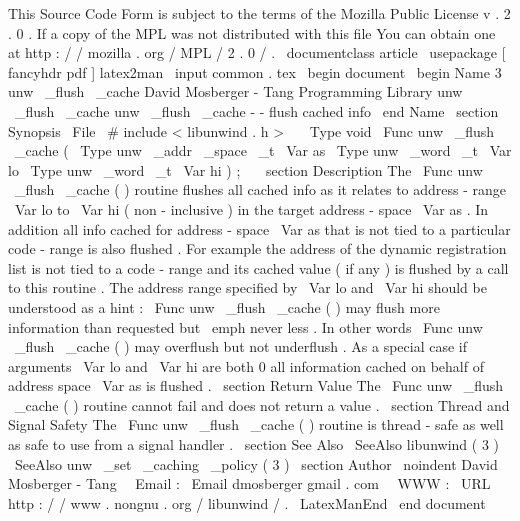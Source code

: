 %
This
Source
Code
Form
is
subject
to
the
terms
of
the
Mozilla
Public
%
License
v
.
2
.
0
.
If
a
copy
of
the
MPL
was
not
distributed
with
this
%
file
You
can
obtain
one
at
http
:
/
/
mozilla
.
org
/
MPL
/
2
.
0
/
.
\
documentclass
{
article
}
\
usepackage
[
fancyhdr
pdf
]
{
latex2man
}
\
input
{
common
.
tex
}
\
begin
{
document
}
\
begin
{
Name
}
{
3
}
{
unw
\
_flush
\
_cache
}
{
David
Mosberger
-
Tang
}
{
Programming
Library
}
{
unw
\
_flush
\
_cache
}
unw
\
_flush
\
_cache
-
-
flush
cached
info
\
end
{
Name
}
\
section
{
Synopsis
}
\
File
{
\
#
include
<
libunwind
.
h
>
}
\
\
\
Type
{
void
}
\
Func
{
unw
\
_flush
\
_cache
}
(
\
Type
{
unw
\
_addr
\
_space
\
_t
}
\
Var
{
as
}
\
Type
{
unw
\
_word
\
_t
}
\
Var
{
lo
}
\
Type
{
unw
\
_word
\
_t
}
\
Var
{
hi
}
)
;
\
\
\
section
{
Description
}
The
\
Func
{
unw
\
_flush
\
_cache
}
(
)
routine
flushes
all
cached
info
as
it
relates
to
address
-
range
\
Var
{
lo
}
to
\
Var
{
hi
}
(
non
-
inclusive
)
in
the
target
address
-
space
\
Var
{
as
}
.
In
addition
all
info
cached
for
address
-
space
\
Var
{
as
}
that
is
not
tied
to
a
particular
code
-
range
is
also
flushed
.
For
example
the
address
of
the
dynamic
registration
list
is
not
tied
to
a
code
-
range
and
its
cached
value
(
if
any
)
is
flushed
by
a
call
to
this
routine
.
The
address
range
specified
by
\
Var
{
lo
}
and
\
Var
{
hi
}
should
be
understood
as
a
hint
:
\
Func
{
unw
\
_flush
\
_cache
}
(
)
may
flush
more
information
than
requested
but
\
emph
{
never
}
less
.
In
other
words
\
Func
{
unw
\
_flush
\
_cache
}
(
)
may
overflush
but
not
underflush
.
As
a
special
case
if
arguments
\
Var
{
lo
}
and
\
Var
{
hi
}
are
both
0
all
information
cached
on
behalf
of
address
space
\
Var
{
as
}
is
flushed
.
\
section
{
Return
Value
}
The
\
Func
{
unw
\
_flush
\
_cache
}
(
)
routine
cannot
fail
and
does
not
return
a
value
.
\
section
{
Thread
and
Signal
Safety
}
The
\
Func
{
unw
\
_flush
\
_cache
}
(
)
routine
is
thread
-
safe
as
well
as
safe
to
use
from
a
signal
handler
.
\
section
{
See
Also
}
\
SeeAlso
{
libunwind
(
3
)
}
\
SeeAlso
{
unw
\
_set
\
_caching
\
_policy
(
3
)
}
\
section
{
Author
}
\
noindent
David
Mosberger
-
Tang
\
\
Email
:
\
Email
{
dmosberger
gmail
.
com
}
\
\
WWW
:
\
URL
{
http
:
/
/
www
.
nongnu
.
org
/
libunwind
/
}
.
\
LatexManEnd
\
end
{
document
}
